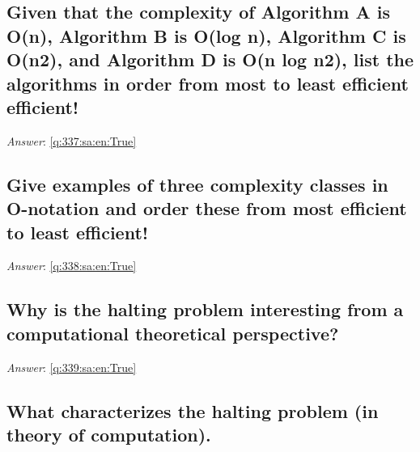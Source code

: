 \documentclass[a4paper,11pt,oneside]{article}
\begin{document}
\begin{sloppypar}
\subsection{Given that the complexity of Algorithm A is O(n), Algorithm B is O(log n), Algorithm C is O(n2), and Algorithm D is O(n log n2), list the algorithms in order from most to least efficient efficient!}

\label{q:337:sa:en:False}

\vspace{2cm}

\noindent\makebox[\textwidth]{\hrulefill}

\vspace{1cm}

\textit{Answer}: \autoref{q:337:sa:en:True}



\subsection{Give examples of three complexity classes in O-notation and order these from most efficient to least efficient!}

\label{q:338:sa:en:False}

\vspace{2cm}

\noindent\makebox[\textwidth]{\hrulefill}

\vspace{1cm}

\textit{Answer}: \autoref{q:338:sa:en:True}



\subsection{Why is the halting problem interesting from a computational theoretical perspective?}

\label{q:339:sa:en:False}

\vspace{2cm}

\noindent\makebox[\textwidth]{\hrulefill}

\vspace{1cm}

\textit{Answer}: \autoref{q:339:sa:en:True}



\subsection{What characterizes the halting problem (in theory of computation).}


\end{sloppypar}
\end{document}
